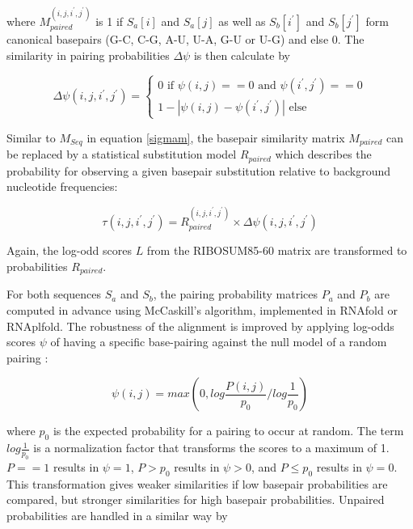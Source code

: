 \documentclass{bmcart}
\begin{document}
\noindent where $M_{paired}^{(i,j,i^\prime,j^\prime)}$ is 1 if $S_a[i]$ and $S_a[j]$ as
well as $S_b[i^\prime]$ and $S_b[j^\prime]$ form canonical basepairs (G-C, C-G,
A-U, U-A, G-U or U-G) and else 0. The similarity in pairing probabilities
$\Delta \psi$ is then calculate by

\begin{equation}\label{eq9}
	\Delta \psi(i,j,i^\prime,j^\prime) = \left\{ \begin{array}{l}
			0 \textrm{ if }\psi(i,j) == 0 
			  \textrm{ and }\psi(i^\prime,j^\prime) == 0 \\
		1 - | \psi(i,j) - \psi(i^\prime,j^\prime) | \textrm{ else}
		\end{array}\right.
\end{equation}

\noindent Similar to $M_{Seq}$ in equation \ref{sigmam}, the basepair similarity matrix
$M_{paired}$ can be replaced by a statistical substitution model $R_{paired}$
which describes the probability for observing a given basepair substitution
relative to background nucleotide frequencies:

\begin{equation}\label{eq10}
	\tau(i,j,i^\prime,j^\prime) = R_{paired}^{(i,j,i^\prime,j^\prime)}
\times \Delta \psi(i,j,i^\prime,j^\prime)
\end{equation}

\noindent Again, the log-odd scores $L$ from the RIBOSUM85-60 matrix \cite{Klein14499004}
are transformed to probabilities $R_{paired}$.

\noindent For both sequences $S_a$ and $S_b$, the pairing probability matrices $P_a$ and
$P_b$ are computed in advance using McCaskill's algorithm, implemented in
RNAfold or RNAplfold. The robustness of the alignment is improved by applying
log-odds scores $\psi$ of having a specific base-pairing against the null model
of a random pairing \cite{Will17432929}:

\begin{equation}\label{eq11}
	\psi(i,j) = max \left( 0, log \frac{P(i,j)}{p_0} / log \frac{1}{p_0} \right)
\end{equation}

\noindent where $p_0$ is the expected probability for a pairing to occur at random. The
term $log \frac{1}{p_0}$ is a normalization factor that transforms the scores to
a maximum of 1. $P==1$ results in $\psi=1$, $P>p_0$ results in $\psi>0$, and $P\le
p_0$ results in $\psi=0$.  This transformation gives weaker similarities if low
basepair probabilities are compared, but stronger similarities for high basepair
probabilities. Unpaired probabilities are handled in a similar way by
\end{document}
